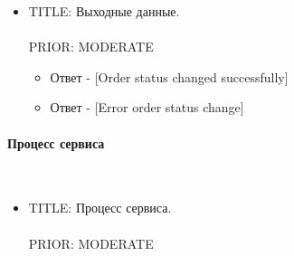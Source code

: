     \begin{itemize}

      \item{

        TITLE: Выходные данные.\\
        \\
        PRIOR: MODERATE\\

      }

        \begin{itemize}
          \item Ответ - [Order status changed successfully] 
          \item Ответ - [Error order status change]
        \end{itemize}

      \end{itemize}

  \paragraph{Процесс сервиса} \mbox{} \\

    \begin{itemize}

         \item {
           TITLE: Процесс сервиса.\\
           \\
           PRIOR: MODERATE\\
         }

         \end{itemize}

